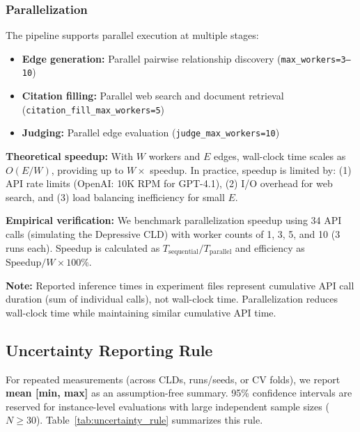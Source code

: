 \subsubsection{Parallelization}
The pipeline supports parallel execution at multiple stages:
\begin{itemize}[noitemsep]
    \item \textbf{Edge generation:} Parallel pairwise relationship discovery (\texttt{max\_workers=3--10})
    \item \textbf{Citation filling:} Parallel web search and document retrieval (\texttt{citation\_fill\_max\_workers=5})
    \item \textbf{Judging:} Parallel edge evaluation (\texttt{judge\_max\_workers=10})
\end{itemize}

\textbf{Theoretical speedup:} With $W$ workers and $E$ edges, wall-clock time scales as $O(E/W)$, providing up to $W\times$ speedup. In practice, speedup is limited by: (1) API rate limits (OpenAI: 10K RPM for GPT-4.1), (2) I/O overhead for web search, and (3) load balancing inefficiency for small $E$.

\textbf{Empirical verification:} We benchmark parallelization speedup using 34 API calls (simulating the Depressive CLD) with worker counts of 1, 3, 5, and 10 (3 runs each). Speedup is calculated as $T_{\text{sequential}} / T_{\text{parallel}}$ and efficiency as $\text{Speedup} / W \times 100\%$.

\textbf{Note:} Reported inference times in experiment files represent cumulative API call duration (sum of individual calls), not wall-clock time. Parallelization reduces wall-clock time while maintaining similar cumulative API time.

\subsection{Uncertainty Reporting Rule}
\label{sec:uncertainty_rule}

For repeated measurements (across CLDs, runs/seeds, or CV folds), we report \textbf{mean [min, max]} as an assumption-free summary. 95\% confidence intervals are reserved for instance-level evaluations with large independent sample sizes ($N \geq 30$). Table~\ref{tab:uncertainty_rule} summarizes this rule.

